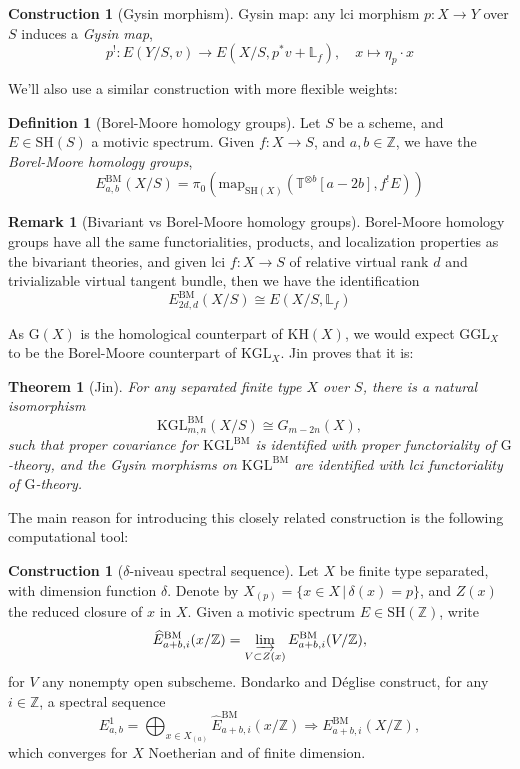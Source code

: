 \documentclass[11pt, twoside]{article}
\numberwithin{equation}{section}
\newtheorem{theorem}[equation]{Theorem}
\theoremstyle{definition}
\newtheorem{definition}[equation]{Definition}
\newtheorem{construction}[equation]{Construction}
\newtheorem{remark}[equation]{Remark}
\newcommand{\bb}[1]{\mathbb{#1}}
\newcommand{\colim}{\varinjlim}
\newcommand{\map}{\mathrm{map}}
\newcommand{\Kgl}{\mathrm{KGL}}
\newcommand{\Ggl}{\mathrm{GGL}}
\newcommand{\sh}{\mathrm{SH}}
\newcommand{\bm}{\mathrm{BM}}
\newcommand{\G}{\mathrm{G}}
\newcommand{\KH}{\mathrm{KH}}
\begin{document}
\begin{construction}[Gysin morphism]
Gysin map: any lci morphism \(p \colon X \to Y\) over \(S\) induces a \emph{Gysin map}, 
\[p^! \colon E(Y/S, v) \to E(X/S, p^*v + \bb{L}_f ), \quad x \mapsto \eta_p \cdot x\]
\end{construction}

We'll also use a similar construction with more flexible weights:

\begin{definition}[Borel-Moore homology groups]\label{def:BM}
Let \(S\) be a scheme, and \(E \in \sh(S)\) a motivic spectrum. Given \(f \colon X \to S\), and \(a, b \in \bb{Z}\), we have the \emph{Borel-Moore homology groups}, 
\[E_{a, b}^\bm(X/S) = \pi_0 \! \left(\map_{\sh(X)}\left(\bb{T}^{\otimes b}[a - 2b], f^!E\right)\right)\]
\end{definition}

\begin{remark}[Bivariant vs Borel-Moore homology groups]
Borel-Moore homology groups have all the same functorialities, products, and localization properties as the bivariant theories, and given lci \(f \colon X \to S\) of relative virtual rank \(d\) and trivializable virtual tangent bundle, then we have the identification
\[E_{2d, d}^\bm(X/S) \cong E(X/S, \bb{L}_f)\]
\end{remark}

As \(\G(X)\) is the homological counterpart of \(\KH(X)\), we would expect \(\Ggl_X\) to be the Borel-Moore counterpart of \(\Kgl_X\). Jin \cite[Corollarly 3.3.7]{Jin} proves that it is:

\begin{theorem}[Jin]
For any separated finite type \(X\) over \(S\), there is a natural isomorphism 
\[\Kgl_{m, n}^\bm(X/S) \cong G_{m - 2n}(X),\]
such that proper covariance for \(\Kgl^\bm\) is identified with proper functoriality of \(\G\)-theory, and the Gysin morphisms on \(\Kgl^\bm\) are identified with lci functoriality of \(\G\)-theory.
\end{theorem}

The main reason for introducing this closely related construction is the following computational tool: 

\begin{construction}[\(\delta\)-niveau spectral sequence]
Let \(X\) be finite type separated, with dimension function \(\delta\). Denote by \(X_{(p)} = \{x \in X \, | \, \delta(x) = p\}\), and \(Z(x)\) the reduced closure of \(x\) in \(X\). Given a motivic spectrum \(E \in \sh(\bb{Z})\), write 
\[\widehat{E}_{a + b, i}^\bm(x/\bb{Z}) = \colim_{V \subset Z(x)} E_{a + b, i}^\bm(V/\bb{Z}),\]
for \(V\) any nonempty open subscheme. Bondarko and Déglise \cite[Definition 3.1.5]{BonDeg} construct, for any \(i \in \bb{Z}\), a spectral sequence 
\begin{equation}\label{eq:dnss}
E_{a, b}^1 = \bigoplus_{x \in X_{(a)}} \widehat{E}_{a + b, i}^\bm(x/\bb{Z}) \Longrightarrow E_{a + b, i}^\bm(X/\bb{Z}),
\end{equation}
which converges for \(X\) Noetherian and of finite dimension.
\end{construction}
\end{document}
